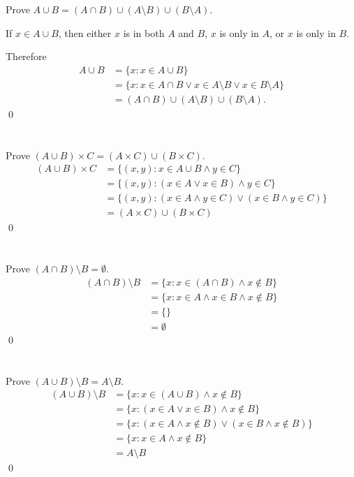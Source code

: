 Prove $A \cup B = (A \cap B) \cup (A \setminus B) \cup (B \setminus A)$.
\hr

If $x \in A \cup B$, then either $x$ is in both $A$ and $B$, $x$ is only in $A$, or $x$ is only in $B$.

\medskip

Therefore
\begin{align*}
    A \cup B &= \{x : x \in A \cup B\} \\
    &= \{x : x \in A \cap B \lor x \in A \setminus B \lor x \in B \setminus A\} \\
    &= (A \cap B) \cup (A \setminus B) \cup (B \setminus A).
\end{align*}\qed

\section{}\label{sec:1-11}

Prove $(A \cup B) \times C = (A \times C) \cup (B \times C)$.
\hr
\begin{align*}
    (A \cup B) \times C &= \{(x, y) : x \in A \cup B \land y \in C\} \\
    &= \{(x, y) : (x \in A \lor x \in B) \land y \in C\} \\
    &= \{(x, y) : (x \in A \land y \in C) \lor (x \in B \land y \in C)\} \\
    &= (A \times C) \cup (B \times C)
\end{align*}\qed

\section{}\label{sec:1-12}

Prove $(A \cap B) \setminus B = \emptyset$.
\hr
\begin{align*}
    (A \cap B) \setminus B &= \{x : x \in (A \cap B) \land x \notin B\} \\
    &= \{x : x \in A \land x \in B \land x \notin B\} \\
    &= \{\} \\
    &= \emptyset
\end{align*}\qed

\section{}\label{sec:1-13}

Prove $(A \cup B) \setminus B = A \setminus B$.
\hr
\begin{align*}
    (A \cup B) \setminus B &= \{x : x \in (A \cup B) \land x \notin B\} \\
    &= \{x : (x \in A \lor x \in B) \land x \notin B\} \\
    &= \{x : (x \in A \land x \notin B) \lor (x \in B \land x \notin B)\} \\
    &= \{x : x \in A \land x \notin B\} \\
    &= A \setminus B
\end{align*}\qed
\pagebreak
